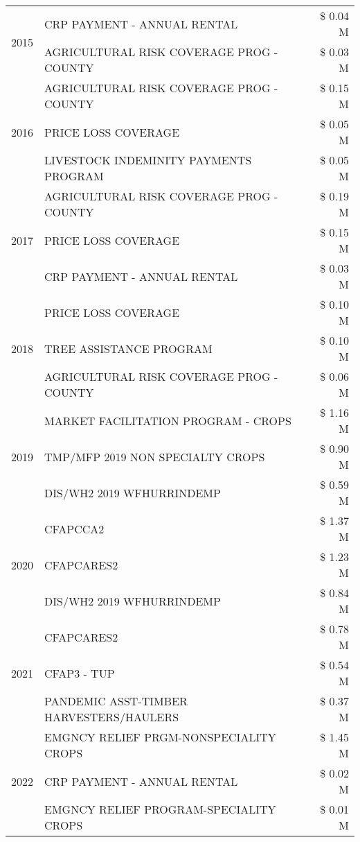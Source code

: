 \begin{tabular}{llr}
\cline{1-3}
\multirow[t]{2}{*}{2015} & CRP PAYMENT - ANNUAL RENTAL & \$ 0.04 M \\
 & AGRICULTURAL RISK COVERAGE PROG - COUNTY & \$ 0.03 M \\
\cline{1-3}
\multirow[t]{3}{*}{2016} & AGRICULTURAL RISK COVERAGE PROG - COUNTY & \$ 0.15 M \\
 & PRICE LOSS COVERAGE & \$ 0.05 M \\
 & LIVESTOCK INDEMINITY PAYMENTS PROGRAM & \$ 0.05 M \\
\cline{1-3}
\multirow[t]{3}{*}{2017} & AGRICULTURAL RISK COVERAGE PROG - COUNTY & \$ 0.19 M \\
 & PRICE LOSS COVERAGE & \$ 0.15 M \\
 & CRP PAYMENT - ANNUAL RENTAL & \$ 0.03 M \\
\cline{1-3}
\multirow[t]{3}{*}{2018} & PRICE LOSS COVERAGE & \$ 0.10 M \\
 & TREE ASSISTANCE PROGRAM & \$ 0.10 M \\
 & AGRICULTURAL RISK COVERAGE PROG - COUNTY & \$ 0.06 M \\
\cline{1-3}
\multirow[t]{3}{*}{2019} & MARKET FACILITATION PROGRAM - CROPS & \$ 1.16 M \\
 & TMP/MFP 2019 NON SPECIALTY CROPS & \$ 0.90 M \\
 & DIS/WH2 2019 WFHURRINDEMP & \$ 0.59 M \\
\cline{1-3}
\multirow[t]{3}{*}{2020} & CFAPCCA2 & \$ 1.37 M \\
 & CFAPCARES2 & \$ 1.23 M \\
 & DIS/WH2 2019 WFHURRINDEMP & \$ 0.84 M \\
\cline{1-3}
\multirow[t]{3}{*}{2021} & CFAPCARES2 & \$ 0.78 M \\
 & CFAP3 - TUP & \$ 0.54 M \\
 & PANDEMIC ASST-TIMBER HARVESTERS/HAULERS & \$ 0.37 M \\
\cline{1-3}
\multirow[t]{3}{*}{2022} & EMGNCY RELIEF PRGM-NONSPECIALITY CROPS & \$ 1.45 M \\
 & CRP PAYMENT - ANNUAL RENTAL & \$ 0.02 M \\
 & EMGNCY RELIEF PROGRAM-SPECIALITY CROPS & \$ 0.01 M \\
\cline{1-3}
\bottomrule
\end{tabular}
